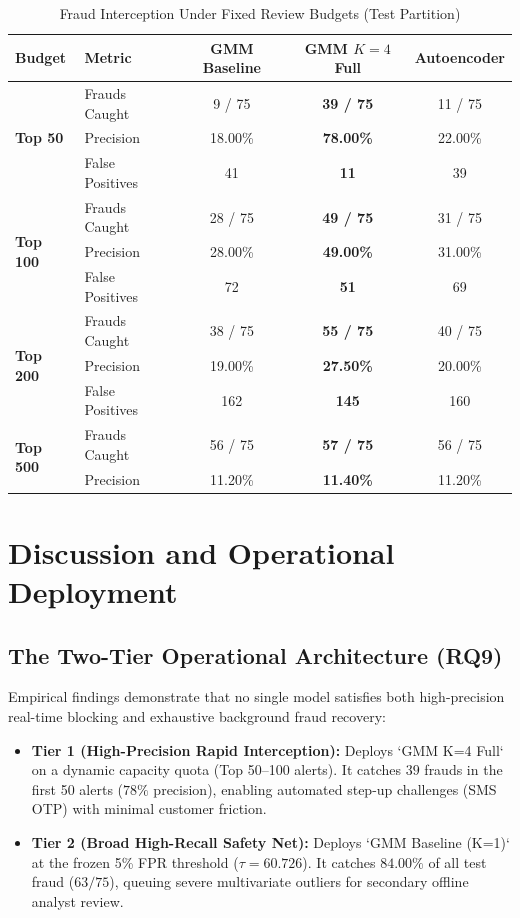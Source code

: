 \documentclass[conference]{IEEEtran}
\begin{document}
\begin{table}[htbp]
\caption{Fraud Interception Under Fixed Review Budgets (Test Partition)}
\centering
\begin{tabular}{llccc}
\toprule
Budget & Metric & GMM Baseline & GMM $K=4$ Full & Autoencoder \\
\midrule
\multirow{3}{*}{\textbf{Top 50}} & Frauds Caught & 9 / 75 & \textbf{39 / 75} & 11 / 75 \\
& Precision & 18.00\% & \textbf{78.00\%} & 22.00\% \\
& False Positives & 41 & \textbf{11} & 39 \\
\midrule
\multirow{3}{*}{\textbf{Top 100}} & Frauds Caught & 28 / 75 & \textbf{49 / 75} & 31 / 75 \\
& Precision & 28.00\% & \textbf{49.00\%} & 31.00\% \\
& False Positives & 72 & \textbf{51} & 69 \\
\midrule
\multirow{3}{*}{\textbf{Top 200}} & Frauds Caught & 38 / 75 & \textbf{55 / 75} & 40 / 75 \\
& Precision & 19.00\% & \textbf{27.50\%} & 20.00\% \\
& False Positives & 162 & \textbf{145} & 160 \\
\midrule
\multirow{2}{*}{\textbf{Top 500}} & Frauds Caught & 56 / 75 & \textbf{57 / 75} & 56 / 75 \\
& Precision & 11.20\% & \textbf{11.40\%} & 11.20\% \\
\bottomrule
\end{tabular}
\label{tab:capacity}
\end{table}

\section{Discussion and Operational Deployment}
\subsection{The Two-Tier Operational Architecture (RQ9)}
Empirical findings demonstrate that no single model satisfies both high-precision real-time blocking and exhaustive background fraud recovery:
\begin{itemize}
    \item \textbf{Tier 1 (High-Precision Rapid Interception):} Deploys `GMM K=4 Full` on a dynamic capacity quota (Top 50--100 alerts). It catches $39$ frauds in the first 50 alerts ($78\%$ precision), enabling automated step-up challenges (SMS OTP) with minimal customer friction.
    \item \textbf{Tier 2 (Broad High-Recall Safety Net):} Deploys `GMM Baseline (K=1)` at the frozen 5\% FPR threshold ($\tau = 60.726$). It catches $84.00\%$ of all test fraud ($63/75$), queuing severe multivariate outliers for secondary offline analyst review.
\end{itemize}
\end{document}
